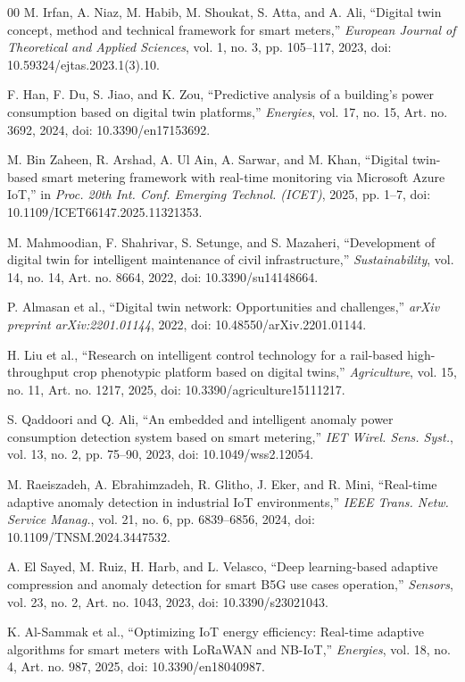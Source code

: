 \documentclass{ieeeaccess}
\begin{document}
\begin{thebibliography}{00}
M. Irfan, A. Niaz, M. Habib, M. Shoukat, S. Atta, and A. Ali,
``Digital twin concept, method and technical framework for smart meters,''
\textit{European Journal of Theoretical and Applied Sciences},
vol. 1, no. 3, pp. 105--117, 2023,
doi: 10.59324/ejtas.2023.1(3).10.

F. Han, F. Du, S. Jiao, and K. Zou,
``Predictive analysis of a building's power consumption based on digital twin platforms,''
\textit{Energies},
vol. 17, no. 15, Art. no. 3692, 2024,
doi: 10.3390/en17153692.

M. Bin Zaheen, R. Arshad, A. Ul Ain, A. Sarwar, and M. Khan,
``Digital twin-based smart metering framework with real-time monitoring via Microsoft Azure IoT,''
in \textit{Proc. 20th Int. Conf. Emerging Technol. (ICET)},
2025, pp. 1--7,
doi: 10.1109/ICET66147.2025.11321353.

M. Mahmoodian, F. Shahrivar, S. Setunge, and S. Mazaheri,
``Development of digital twin for intelligent maintenance of civil infrastructure,''
\textit{Sustainability},
vol. 14, no. 14, Art. no. 8664, 2022,
doi: 10.3390/su14148664.

P. Almasan et al.,
``Digital twin network: Opportunities and challenges,''
\textit{arXiv preprint arXiv:2201.01144}, 2022,
doi: 10.48550/arXiv.2201.01144.

H. Liu et al.,
``Research on intelligent control technology for a rail-based high-throughput crop phenotypic platform based on digital twins,''
\textit{Agriculture},
vol. 15, no. 11, Art. no. 1217, 2025,
doi: 10.3390/agriculture15111217.

S. Qaddoori and Q. Ali,
``An embedded and intelligent anomaly power consumption detection system based on smart metering,''
\textit{IET Wirel. Sens. Syst.},
vol. 13, no. 2, pp. 75--90, 2023,
doi: 10.1049/wss2.12054.

M. Raeiszadeh, A. Ebrahimzadeh, R. Glitho, J. Eker, and R. Mini,
``Real-time adaptive anomaly detection in industrial IoT environments,''
\textit{IEEE Trans. Netw. Service Manag.},
vol. 21, no. 6, pp. 6839--6856, 2024,
doi: 10.1109/TNSM.2024.3447532.

A. El Sayed, M. Ruiz, H. Harb, and L. Velasco,
``Deep learning-based adaptive compression and anomaly detection for smart B5G use cases operation,''
\textit{Sensors},
vol. 23, no. 2, Art. no. 1043, 2023,
doi: 10.3390/s23021043.

K. Al-Sammak et al.,
``Optimizing IoT energy efficiency: Real-time adaptive algorithms for smart meters with LoRaWAN and NB-IoT,''
\textit{Energies},
vol. 18, no. 4, Art. no. 987, 2025,
doi: 10.3390/en18040987.


\end{thebibliography}
\end{document}
